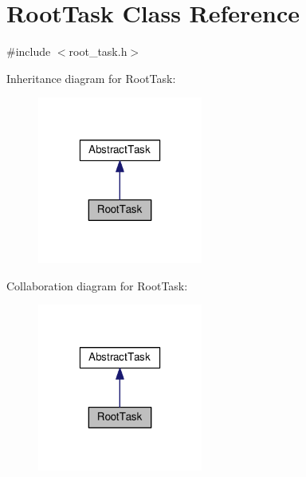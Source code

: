 \hypertarget{classRootTask}{\section{Root\-Task Class Reference}
\label{classRootTask}
}


{\ttfamily \#include $<$root\-\_\-task.\-h$>$}



Inheritance diagram for Root\-Task\-:
\nopagebreak
\begin{figure}[H]
\begin{center}
\leavevmode
\includegraphics[width=154pt]{classRootTask__inherit__graph}
\end{center}
\end{figure}


Collaboration diagram for Root\-Task\-:
\nopagebreak
\begin{figure}[H]
\begin{center}
\leavevmode
\includegraphics[width=154pt]{classRootTask__coll__graph}
\end{center}
\end{figure}
